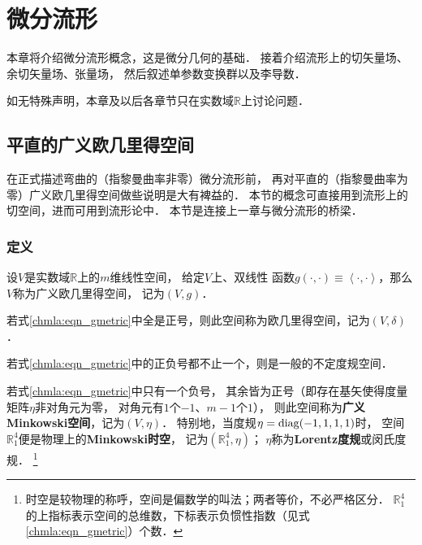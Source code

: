 
\chapter{微分流形}\label{chdm}
本章将介绍微分流形概念，这是微分几何的基础．
接着介绍流形上的切矢量场、余切矢量场、张量场，
然后叙述单参数变换群以及李导数．


如无特殊声明，本章及以后各章节只在实数域$\mathbb{R}$上讨论问题．


\section{平直的广义欧几里得空间}\label{chdm:sec_Euclidean-space}

在正式描述弯曲的（指黎曼曲率非零）微分流形前，
再对平直的（指黎曼曲率为零）广义欧几里得空间做些说明是大有裨益的．
本节的概念可直接用到流形上的切空间，进而可用到流形论中．
本节是连接上一章与微分流形的桥梁．



\subsection{定义}\label{chdm:sec_gen-Euclidean-space}

\begin{definition}\label{chdm:def_MinkowskiSpace}
    设$V$是实数域$\mathbb{R}$上的$m$维线性空间，
    给定$V$上{、}双线性
    函数$g(\cdot,\cdot)\equiv \left<\cdot,\cdot\right>$，那么$V$称为{\heiti 广义欧几里得空间}，
    记为$(V,g)$．
    
    若式\eqref{chmla:eqn_gmetric}中全是正号，则此空间称为{\heiti 欧几里得空间}，记为$(V,\delta)$．

    若式\eqref{chmla:eqn_gmetric}中的正负号都不止一个，则是一般的不定度规空间．
    
    若式\eqref{chmla:eqn_gmetric}中只有一个负号，
    其余皆为正号（即存在基矢使得度量矩阵$\eta$非对角元为零，
    对角元有$1$个$-1$、$m-1$个$1$），
    则此空间称为{\heiti\bfseries 广义Minkowski空间}，记为$(V,\eta)$．
    特别地，当度规$\eta = {\rm diag}(-1,1,1,1)$时，
    空间$\mathbb{R}^4_1$便是物理上的{\heiti\bfseries Minkowski时空}，
    记为$(\mathbb{R}^4_1,\eta)$；
    $\eta$称为{\heiti\bfseries Lorentz度规}或闵氏度规．
    {\footnote{{\kaishu 时空}是较物理的称呼，{\kaishu 空间}是偏数学的叫法；两者等价，不必严格区分．
    $\mathbb{R}^4_1$的上指标表示空间的总维数，下标表示负惯性指数（见式\eqref{chmla:eqn_gmetric}）个数．}}
\end{definition}
    
